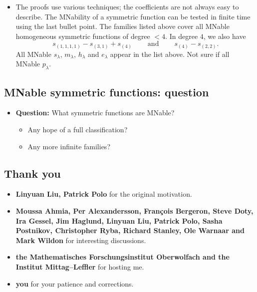 \documentclass[numbers=enddot,12pt,final,onecolumn,notitlepage]{scrartcl}%
\newcommand{\0}{\phantom{c}}
\begin{document}
\begin{itemize}
\begin{theorem}{Known families of MNables}{}
\begin{itemize}
\item A symmetric function $f\in\Lambda$ is MNable if and only if $\left(
f,s_{\lambda/\mu}\right)  \in\left\{  -1,0,1\right\}  $ for each skew
partition $\lambda/\mu$.
\end{itemize}
\end{theorem}

\item {The proofs use various techniques; the coefficients are not always easy
to describe.} {The MNability of a symmetric function can be tested in finite
time using the last bullet point.} {The families listed above cover all MNable
homogeneous symmetric functions of degree $<4$. In degree $4$, we also have%
\[
s_{\left(  1,1,1,1\right)  }-s_{\left(  3,1\right)  }+s_{\left(  4\right)
}\ \ \ \ \ \ \ \ \ \ \text{and}\ \ \ \ \ \ \ \ \ \ s_{\left(  4\right)
}-s_{\left(  2,2\right)  }.
\]
} {All MNable $s_{\lambda}$, $m_{\lambda}$, $h_{\lambda}$ and $e_{\lambda}$
appear in the list above. Not sure if all MNable $p_{\lambda}$.}
\end{itemize}

\subsection{MNable symmetric functions: question}

\begin{itemize}
\item \textbf{Question:} What symmetric functions are MNable?

\begin{itemize}
\item Any hope of a full classification?

\item Any more infinite families?
\end{itemize}
\end{itemize}

\subsection{Thank you}

\begin{itemize}
\item \textbf{Linyuan Liu, Patrick Polo} for the original motivation.

\item \textbf{Moussa Ahmia, Per Alexandersson, François Bergeron, Steve Doty, Ira Gessel, Jim Haglund, Linyuan Liu, Patrick Polo, Sasha Postnikov, Christopher Ryba, Richard Stanley, Ole Warnaar and Mark Wildon} for interesting discussions.

\item \textbf{the Mathematisches Forschungsinstitut Oberwolfach and the
Institut Mittag--Leffler} for hosting me.

\item \textbf{you} for your patience and corrections.
\end{itemize}
\end{document}
